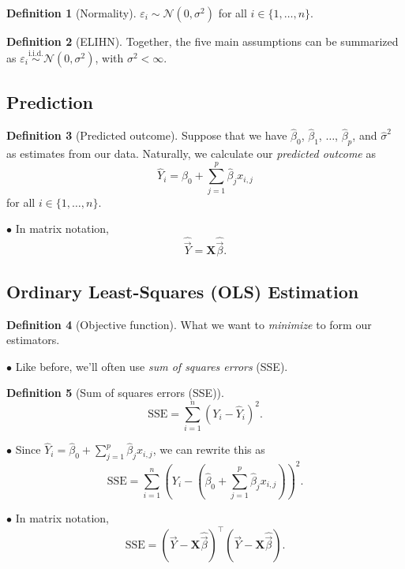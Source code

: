 \documentclass[12pt,oneside]{article}
\newcommand{\N}{\mathcal{N}}
\newcommand{\simiid}{\overset{\text{i.i.d.}}{\sim}}
\newcommand{\SSE}{\text{SSE}}
\theoremstyle{definition}
\newtheorem{definition}{Definition}
\theoremstyle{remark}
\begin{document}
\begin{definition}[Normality]
$\varepsilon_i \sim \N(0, \sigma^2)$ for all $i \in \{1, \ldots, n\}$.
\end{definition}

\begin{definition}[ELIHN]
Together, the five main assumptions can be summarized as $\varepsilon_i \simiid \N(0, \sigma^2)$, with $\sigma^2 < \infty$.
\end{definition}

\subsection{Prediction}

\begin{definition}[Predicted outcome]
Suppose that we have $\hat{\beta}_0$, $\hat{\beta}_1$, $\ldots$, $\hat{\beta}_p$, and $\hat{\sigma}^2$ as estimates from our data. Naturally, we calculate our \textit{predicted outcome} as \[\hat{Y}_i = \hat{\beta}_0 + \sum_{j = 1}^{p} \hat{\beta}_j x_{i, j}\] for all $i \in \{1, \ldots, n\}$.

$\bullet$ In matrix notation, \[\widehat{\vec{Y}} = \boldsymbol{X} \widehat{\vec{\beta}}.\]
\end{definition}

\subsection{Ordinary Least-Squares (OLS) Estimation}

\begin{definition}[Objective function]
What we want to \textit{minimize} to form our estimators.

$\bullet$ Like before, we'll often use \textit{sum of squares errors} (SSE).
\end{definition}

\begin{definition}[Sum of squares errors (SSE)]
\[\SSE = \sum_{i = 1}^{n} (Y_i - \hat{Y}_i)^2.\]

$\bullet$ Since $\hat{Y}_i = \hat{\beta}_0 + \sum_{j = 1}^{p} \hat{\beta}_j x_{i, j}$, we can rewrite this as \[\SSE = \sum_{i = 1}^{n} \left( Y_i - (\hat{\beta}_0 + \sum_{j = 1}^{p} \hat{\beta}_j x_{i, j}) \right)^2.\]

$\bullet$ In matrix notation, \[\SSE = (\vec{Y} - \boldsymbol{X} \widehat{\vec{\beta}})^{\top} (\vec{Y} - \boldsymbol{X} \widehat{\vec{\beta}}).\]
\end{definition}
\end{document}

